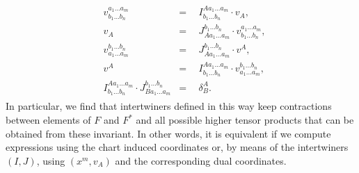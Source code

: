 \documentclass[a4paper,12pt, DIV=14, BCOR=5mm, twoside, headsepline, numbers=noenddot]{scrbook}
\begin{document}
\begin{align} \label{interRel}
    \begin{aligned}
    & v^{a_1 ... a_m}_{b_1 ... b_n} & = & \ \ I^{A a_1 ... a_m}_{b_1 ... b_n} \cdot v_{A},\\  
    & v_A & = & \ \ J^{b_1 ... b_n}_{A a_1 ... a_m} \cdot v^{a_1 ... a_m}_{b_1 ... b_n}, \\
    & v^{b_1 ... b_n}_{a_1 ... a_m} & = & \ \  J^{b_1 ... b_n}_{A a_1 ... a_m} \cdot v^A, \\ 
    & v^A & = & \ \  I^{A a_1 ... a_m}_{b_1 ... b_n} \cdot v^{b_1 ... b_n}_{a_1 ... a_m}, \\
    & I^{A a_1 ... a_m}_{b_1 ... b_n} \cdot J^{b_1 ... b_n}_{B a_1 ... a_m} & = & \ \ \delta^A _ B. 
    \end{aligned}
\end{align}
In particular, we find that intertwiners defined in this way keep contractions between elements of $F$ and $F^{\ast}$ and all possible higher tensor products that can be obtained from these invariant. In other words, it is equivalent if we compute expressions using the chart induced coordinates or, by means of the intertwiners $(I,J)$, using $(x^m, v_A)$ and the corresponding dual coordinates.
\end{document}
